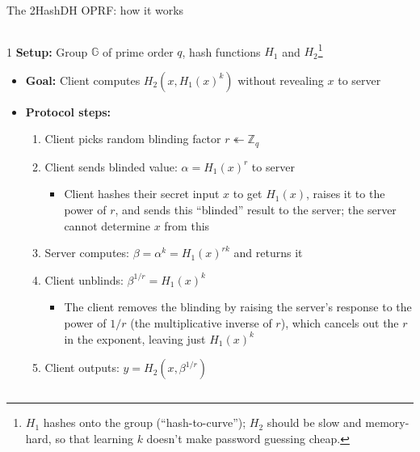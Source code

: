 \ifdefined\PRESENTATION\else\PassOptionsToClass{handout}{beamer}\fi\documentclass[aspectratio=169, lualatex]{beamer}
\begin{document}
\begin{frame}{The 2HashDH OPRF: how it works}
	\begin{columns}[c]
		\begin{column}{1\textwidth}
			\textbf{Setup:} Group $\mathbb{G}$ of prime order $q$, hash functions $H_1$ and $H_2$\footnote{$H_1$ hashes onto the group (``hash-to-curve''); $H_2$ should be slow and memory-hard, so that learning $k$ doesn't make password guessing cheap.}
			\begin{itemize}
				\item \textbf{Goal:} Client computes $H_2(x, H_1(x)^k)$ without revealing $x$ to server
				\item \textbf{Protocol steps:}
				      \begin{enumerate}
					      \item Client picks random blinding factor $r \twoheadleftarrow \mathbb{Z}_q$
					      \item Client sends blinded value: $\alpha = H_1(x)^r$ to server
						            {\footnotesize\begin{itemize}
								            \item Client hashes their secret input $x$ to get $H_1(x)$, raises it to the power of $r$, and sends this ``blinded'' result to the server; the server cannot determine $x$ from this
							            \end{itemize}}
					      \item Server computes: $\beta = \alpha^k = H_1(x)^{rk}$ and returns it
					      \item Client unblinds: $\beta^{1/r} = H_1(x)^k$
					            {\footnotesize\begin{itemize}
							            \item The client removes the blinding by raising the server's response to the power of $1/r$ (the multiplicative inverse of $r$), which cancels out the $r$ in the exponent, leaving just $H_1(x)^k$
						            \end{itemize}}
					      \item Client outputs: $y = H_2(x, \beta^{1/r})$
				      \end{enumerate}
			\end{itemize}
		\end{column}
	\end{columns}
\end{frame}
\end{document}
